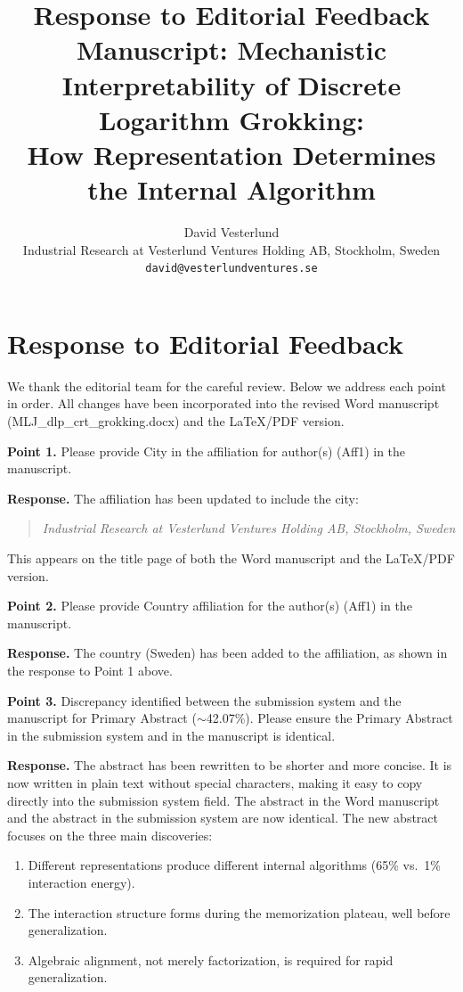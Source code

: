 \documentclass[11pt,a4paper]{article}
\title{Response to Editorial Feedback \\
\large Manuscript: Mechanistic Interpretability of Discrete Logarithm Grokking: \\
How Representation Determines the Internal Algorithm}
\author{David Vesterlund \\
Industrial Research at Vesterlund Ventures Holding AB, Stockholm, Sweden \\
\texttt{david@vesterlundventures.se}}
\date{}
\begin{document}
\maketitle

\section*{Response to Editorial Feedback}

We thank the editorial team for the careful review. Below we address each point in order. All changes have been incorporated into the revised Word manuscript (MLJ\_dlp\_crt\_grokking.docx) and the LaTeX/PDF version.

\bigskip

\textbf{Point 1.} Please provide City in the affiliation for author(s) (Aff1) in the manuscript.

\textbf{Response.} The affiliation has been updated to include the city:
\begin{quote}
\textit{Industrial Research at Vesterlund Ventures Holding AB, Stockholm, Sweden}
\end{quote}
This appears on the title page of both the Word manuscript and the LaTeX/PDF version.

\bigskip

\textbf{Point 2.} Please provide Country affiliation for the author(s) (Aff1) in the manuscript.

\textbf{Response.} The country (Sweden) has been added to the affiliation, as shown in the response to Point 1 above.

\bigskip

\textbf{Point 3.} Discrepancy identified between the submission system and the manuscript for Primary Abstract ($\sim$42.07\%). Please ensure the Primary Abstract in the submission system and in the manuscript is identical.

\textbf{Response.} The abstract has been rewritten to be shorter and more concise. It is now written in plain text without special characters, making it easy to copy directly into the submission system field. The abstract in the Word manuscript and the abstract in the submission system are now identical. The new abstract focuses on the three main discoveries:
\begin{enumerate}
\item Different representations produce different internal algorithms (65\% vs.\ 1\% interaction energy).
\item The interaction structure forms during the memorization plateau, well before generalization.
\item Algebraic alignment, not merely factorization, is required for rapid generalization.
\end{enumerate}
\end{document}
